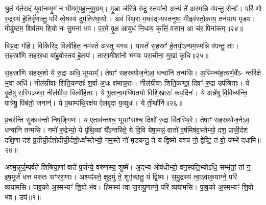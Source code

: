 श्रु॒तं ग॑र्त॒सदं॒ युवा॑नम्मृ॒गं न भी॒ममु॑पह॒त्नुमु॒ग्रम्। मृ॒डा ज॑रि॒त्रे रु॑द्र॒ स्तवा॑नो अ॒न्यं ते॑ अ॒स्मन्नि व॑पन्तु॒ सेनाः᳚। परि॑ णो रु॒द्रस्य॑ हे॒तिर्वृ॑णक्तु॒ परि॑ त्वे॒षस्य॑ दुर्म॒तिर॑घा॒योः। अव॑ स्थि॒रा म॒घव॑द्भ्यस्तनुष्व॒ मीढ्व॑स्तो॒काय॒ तन॑याय मृडय। मीढु॑ष्टम॒ शिव॑तम शि॒वो नः॑ सु॒मना॑ भव। प॒र॒मे वृ॒क्ष आयु॑धं नि॒धाय॒ कृत्तिं॒ वसा॑न॒ आ च॑र॒ पिना॑कम्॥२४॥

बिभ्र॒दा ग॑हि। विकि॑रिद॒ विलो॑हित॒ नम॑स्ते अस्तु भगवः। यास्ते॑ स॒हस्रꣳ॑ हे॒तयो॒\-ऽन्यम॒स्मन्नि व॑पन्तु॒ ताः। स॒हस्रा॑णि सहस्र॒धा बा॑हु॒वोस्तव॑ हे॒तयः॑। तासा॒मीशा॑नो भगवः परा॒चीना॒ मुखा॑ कृधि॥२५॥

{\anuvakamend[{अ॒स्मिꣴ स्त॒नुवः॑ स्तु॒हि पिना॑क॒मेका॒न्नत्रि॒ꣳ॒शच्च॑॥10॥}]}

स॒हस्रा॑णि सहस्र॒शो ये रु॒द्रा अधि॒ भूम्याम्᳚। तेषाꣳ॑ सहस्रयोज॒ने\-ऽव॒ धन्वा॑नि तन्मसि। अ॒स्मिन्म॑ह॒त्य॑र्ण॒वे᳚\-ऽ- न्तरि॑क्षे भ॒वा अधि॑। नील॑ग्रीवाः शिति॒कण्ठाः᳚ श॒र्वा अ॒धः क्ष॑माच॒राः। नील॑ग्रीवाः शिति॒कण्ठा॒ दिवꣳ॑ रु॒द्रा उप॑श्रिताः। ये वृ॒क्षेषु॑ स॒स्पिञ्ज॑रा॒ नील॑ग्रीवा॒ विलो॑हिताः। ये भू॒ताना॒मधि॑पतयो विशि॒खासः॑ कप॒र्दिनः॑। ये अन्ने॑षु वि॒विध्य॑न्ति॒ पात्रे॑षु॒ पिब॑तो॒ जनान्॑। ये प॒थाम्प॑थि॒रक्ष॑य ऐलबृ॒दा य॒व्युधः॑। ये ती॒र्थानि॑॥२६॥

प्र॒चर॑न्ति सृ॒काव॑न्तो निष॒ङ्गिणः॑। य ए॒ताव॑न्तश्च॒ भूयाꣳ॑सश्च॒ दिशो॑ रु॒द्रा वि॑तस्थि॒रे। तेषाꣳ॑ सहस्रयोज॒ने\-ऽव॒ धन्वा॑नि तन्मसि। नमो॑ रु॒द्रेभ्यो॒ ये पृ॑थि॒व्यां ये᳚\-ऽन्तरि॑क्षे॒ ये दि॒वि येषा॒मन्नं॒ वातो॑ व॒र्\mbox{}षमिष॑व॒स्तेभ्यो॒ दश॒ प्राची॒र्दश॑ दक्षि॒णा दश॑ प्र॒तीची॒र्दशोदी॑ची॒र्दशो॒र्ध्वास्तेभ्यो॒ नम॒स्ते नो॑ मृडयन्तु॒ ते यं द्वि॒ष्मो यश्च॑ नो॒ द्वेष्टि॒ तं वो॒ जम्भे॑ दधामि॥२७॥


{\anuvakamend[{ती॒र्थानि॒ यश्च॒ षट्च॑॥11॥}]}

{}

{}

\setcounter{anuvakam}{0}
अश्म॒न्नूर्ज॒म्पर्व॑ते शिश्रिया॒णां वाते॑ प॒र्जन्ये॒ वरु॑णस्य॒ शुष्मे᳚। अ॒द्भ्य ओष॑धीभ्यो॒ वन॒स्पति॒भ्यो\-ऽधि॒ सम्भृ॑तां॒ तां न॒ इष॒मूर्जं॑ धत्त मरुतः सꣳररा॒णाः। अश्मꣴ॑स्ते॒ क्षुद॒मुं ते॒ शुगृ॑च्छतु॒ यं द्वि॒ष्मः। स॒मु॒द्रस्य॑ त्वा॒\-ऽवाक॒याग्ने॒ परि॑ व्ययामसि। पाव॒को अ॒स्मभ्यꣳ॑ शि॒वो भ॑व। हि॒मस्य॑ त्वा ज॒रायु॒णाग्ने॒ परि॑ व्ययामसि। पा॒व॒को अ॒स्मभ्यꣳ॑ शि॒वो भ॑व। उप॑॥१॥

